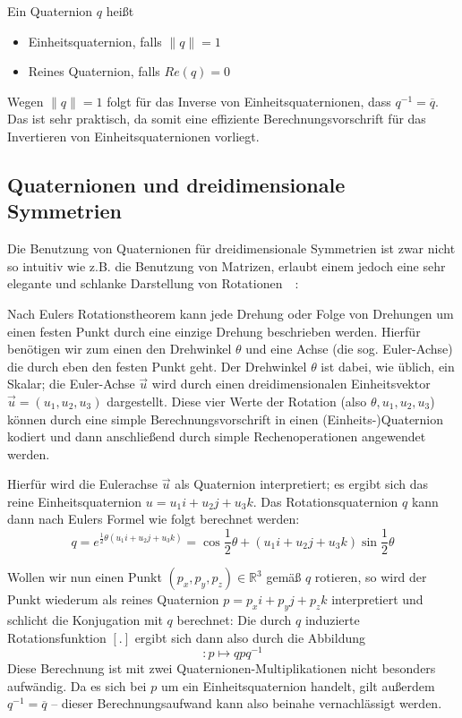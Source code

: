 \begin{definition}
Ein Quaternion $q$ heißt 
\begin{itemize}
\item Einheitsquaternion, falls $\|q\| = 1$
\item Reines Quaternion, falls $Re(q) = 0$
\end{itemize}\vspace{-0.9cm}
\end{definition}
Wegen $\|q\| = 1$ folgt für das Inverse von Einheitsquaternionen, dass $q^{-1} = \overline{q}$. Das ist sehr praktisch,
da somit eine effiziente Berechnungsvorschrift für das Invertieren von Einheitsquaternionen vorliegt.

\subsection{Quaternionen und dreidimensionale Symmetrien}
Die Benutzung von Quaternionen für dreidimensionale Symmetrien ist zwar nicht so intuitiv wie z.B. die Benutzung von Matrizen,
erlaubt einem jedoch eine sehr elegante und schlanke Darstellung von Rotationen~\cite{conway2003}~\cite{du1964}: 

Nach Eulers Rotationstheorem kann jede Drehung oder Folge von Drehungen um einen festen Punkt durch eine einzige Drehung beschrieben werden.
Hierfür benötigen wir zum einen den Drehwinkel $\theta$ und eine Achse (die sog. Euler-Achse) die durch eben den festen Punkt geht.
Der Drehwinkel $\theta$ ist dabei, wie üblich, ein Skalar; die Euler-Achse $\overrightarrow{u}$ wird durch einen dreidimensionalen Einheitsvektor $\overrightarrow{u} = (u_1,u_2,u_3)$ dargestellt. Diese vier Werte der Rotation (also $\theta, u_1, u_2, u_3$) können durch eine simple
Berechnungsvorschrift in einen (Einheits-)Quaternion kodiert und dann anschließend durch simple Rechenoperationen
angewendet werden.

Hierfür wird die Eulerachse $\overrightarrow{u}$ als Quaternion interpretiert; es ergibt sich das reine Einheitsquaternion
$u = u_1 i + u_2 j + u_3 k$. Das Rotationsquaternion $q$ kann dann nach Eulers Formel wie folgt berechnet werden:
\begin{equation*}
q = e^{\frac{1}{2} \theta \left( u_1 i + u_2 j + u_3 k \right)} = \cos \frac{1}{2} \theta + \left( u_1 i + u_2 j + u_3 k \right) \sin \frac{1}{2} \theta
\end{equation*}

\noindent Wollen wir nun einen Punkt $(p_x, p_y, p_z) \in \mathbb{R}^3$ gemäß $q$ rotieren, so wird der Punkt wiederum als reines Quaternion
$p = p_x i + p_y j + p_z k$ interpretiert und schlicht die Konjugation mit $q$ berechnet:
Die durch $q$ induzierte Rotationsfunktion $[.]$ ergibt sich dann also durch die Abbildung
\begin{equation*}
[q]: p \mapsto q p q^{-1}
\end{equation*}
Diese Berechnung ist mit zwei Quaternionen-Multiplikationen nicht besonders aufwändig.
Da es sich bei $p$ um ein Einheitsquaternion handelt, gilt außerdem $q^{-1} = \overline{q}$ -- dieser Berechnungsaufwand
kann also beinahe vernachlässigt werden. \\

